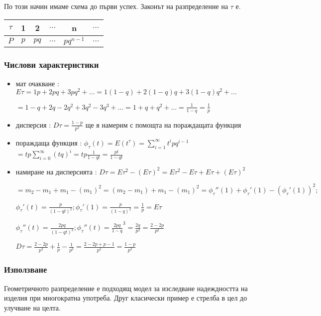 \documentclass[fleqn,12pt]{article}
\begin{document}
\begin{justify}
По този начин имаме схема до първи успех. Законът на разпределение на $\tau$ е.

\begin{tabular}{|c|c|c|c|c|c|}
    \hline
    $\tau$ & 1 & 2 & $\dots$ & n & $\dots$ \\
    \hline
    $P$ & $p$ & $pq$ & $\dots$ & $p q^{n-1}$ & $\dots$ \\
    \hline
\end{tabular}

\subsubsection{Числови характеристики} 
\begin{itemize}
    \item мат очакване : $E\tau = 1p + 2pq + 3pq^2 + \dots = 1(1 - q) + 2(1-q)q + 3(1-q)q^2 + \dots $

    $= 1 - q + 2q - 2q^2 + 3q^2 -3q^3 + \dots = 1 + q + q^2 + \dots = \frac{1}{1-q} = \frac{1}{p}$
    \item дисперсия : $D\tau = \frac{1-p}{p^2}$ ще я намерим с помощта на пораждащата функция
    \item пораждаща функция : $\phi_\tau(t) = E(t^\tau) = \sum_{i=1}^\infty t^i p q^{i - 1}$
    $ = tp \sum_{i=0}^\infty (tq)^i = tp \frac{1}{1-qt} = \frac{pt}{1-qt}$
    \item намиране на дисперсията : 
    $D\tau = E\tau^2 - (E\tau)^2 = E\tau^2 - E\tau + E\tau + (E\tau)^2 $

    $= m_2 - m_1 + m_1 - (m_1)^2 = (m_2 - m_1) + m_1 - (m_1)^2 = \phi_\tau''(1) + \phi_\tau'(1) - (\phi_\tau'(1))^2;$
    
    \vspace{10pt}
    $\phi_\tau'(t) = \frac{p}{(1-qt)^2}; \phi_\tau'(1) = \frac{p}{(1-q)^2} = \frac{1}{p} = E\tau$
    
    $\phi_\tau''(t) = \frac{2pq}{(1-qt)^3}; \phi_\tau''(t) = \frac{2pq}{1-q}^3 = \frac{2q}{p^2} = \frac{2- 2p}{p^2}$
    
    \vspace{10pt}
    $D\tau = \frac{2- 2p}{p^2} + \frac{1}{p} - \frac{1}{p^2} = \frac{2-2p+p-1}{p^2} = \frac{1-p}{p^2}$
\end{itemize}
\subsubsection{Използване} 
Геометричното разпределение е подходящ модел за изследване надеждността на изделия при многократна употреба. Друг
класически пример е стрелба в цел до улучване на целта.


\end{justify}
\end{document}
